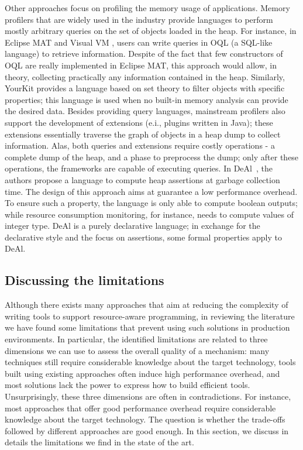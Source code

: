 Other approaches focus on profiling the memory usage of applications.
Memory profilers that are widely used in the industry provide languages to perform mostly arbitrary queries on the set of objects loaded in the heap.
For instance, in Eclipse MAT \cite{Biermann:2006:GDI:2087202.2087244} and Visual VM \cite{OQL-visualvm}, users can write queries in OQL (a SQL-like language) to retrieve information.
Despite of the fact that few constructors of OQL are really implemented in Eclipse MAT, this approach would allow, in theory, collecting practically any information contained in the heap.
Similarly, YourKit \cite{yourkit} provides a language based on set theory to filter objects with specific properties; this language is used when no built-in memory analysis can provide the desired data.
Besides providing query languages, mainstream profilers also support the development of extensions (e.i., plugins written in Java); these extensions essentially traverse the graph of objects in a heap dump to collect information.
Alas, both queries and extensions require costly operations - a complete dump of the heap, and a phase to preprocess the dump; only after these operations, the frameworks are capable of executing queries.
In DeAl~\cite{Reichenbach:2010:GCE:1869459.1869482}, the authors propose a language to compute heap assertions at garbage collection time.
The design of this approach aims at guarantee a low performance overhead.
To ensure such a property, the language is only able to compute boolean outputs; while resource consumption monitoring, for instance, needs to compute values of integer type.
DeAl is a purely declarative language; in exchange for the declarative style and the focus on assertions, some formal properties apply to DeAl. 

\subsection{Discussing the limitations}

Although there exists many approaches that aim at reducing the complexity of writing tools to support resource-aware programming, in reviewing the literature we have found some limitations that prevent using such solutions in production environments.
In particular, the identified limitations are related to three dimensions we can use to assess the overall quality of a mechanism: many techniques still require considerable knowledge about the target technology, tools built using existing approaches often induce high performance overhead, and most solutions lack the power to express how to build efficient tools.
Unsurprisingly, these three dimensions are often in contradictions.
For instance, most approaches that offer good performance overhead require considerable knowledge about the target technology.
The question is whether the trade-offs followed by different approaches are good enough.
In this section, we discuss in details the limitations we find in the state of the art.

